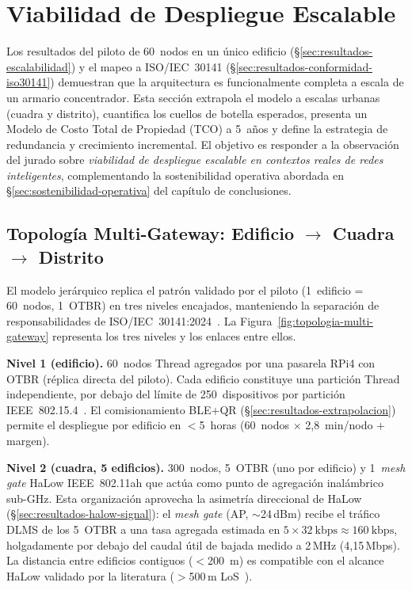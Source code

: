 \section{Viabilidad de Despliegue Escalable}
\label{sec:resultados-viabilidad-escalable}

Los resultados del piloto de 60~nodos en un único edificio (§\ref{sec:resultados-escalabilidad}) y el mapeo a ISO/IEC~30141 (§\ref{sec:resultados-conformidad-iso30141}) demuestran que la arquitectura es funcionalmente completa a escala de un armario concentrador. Esta sección extrapola el modelo a escalas urbanas (cuadra y distrito), cuantifica los cuellos de botella esperados, presenta un Modelo de Costo Total de Propiedad (TCO) a 5~años y define la estrategia de redundancia y crecimiento incremental. El objetivo es responder a la observación del jurado sobre \emph{viabilidad de despliegue escalable en contextos reales de redes inteligentes}, complementando la sostenibilidad operativa abordada en §\ref{sec:sostenibilidad-operativa} del capítulo de conclusiones.

\subsection{Topología Multi-Gateway: Edificio $\rightarrow$ Cuadra $\rightarrow$ Distrito}
\label{sec:viabilidad-multi-gateway}

El modelo jerárquico replica el patrón validado por el piloto (1~edificio = 60~nodos, 1~OTBR) en tres niveles encajados, manteniendo la separación de responsabilidades de ISO/IEC~30141:2024~\cite{ISOIEC30141v2024}. La Figura~\ref{fig:topologia-multi-gateway} representa los tres niveles y los enlaces entre ellos.



\textbf{Nivel 1 (edificio).} 60~nodos Thread agregados por una pasarela RPi4 con OTBR (réplica directa del piloto). Cada edificio constituye una partición Thread independiente, por debajo del límite de 250~dispositivos por partición IEEE~802.15.4~\cite{ThreadGroup2023}. El comisionamiento BLE+QR (§\ref{sec:resultados-extrapolacion}) permite el despliegue por edificio en $<$5~horas (60~nodos $\times$ 2{,}8~min/nodo + margen).

\textbf{Nivel 2 (cuadra, 5 edificios).} 300~nodos, 5~OTBR (uno por edificio) y 1~\emph{mesh gate} HaLow IEEE~802.11ah que actúa como punto de agregación inalámbrico sub-GHz. Esta organización aprovecha la asimetría direccional de HaLow (§\ref{sec:resultados-halow-signal}): el \emph{mesh gate} (AP, $\sim$24\,dBm) recibe el tráfico DLMS de los 5~OTBR a una tasa agregada estimada en $5 \times 32~\text{kbps} \approx 160~\text{kbps}$, holgadamente por debajo del caudal útil de bajada medido a 2\,MHz (4{,}15\,Mbps). La distancia entre edificios contiguos ($<$200~m) es compatible con el alcance HaLow validado por la literatura ($>$500\,m LoS~\cite{leeWiFiHaLowLongRange2021}).

